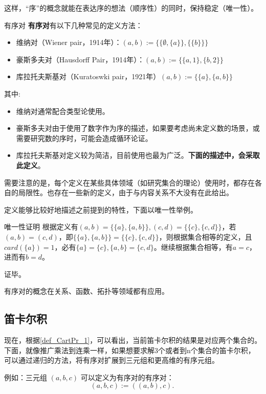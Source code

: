 这样，“序”的概念就能在表达序的想法（顺序性）的同时，保持稳定（唯一性）。

\begin{definition}{有序对}
\textbf{有序对}有以下几种常见的定义方法：
\begin{itemize}
\item 维纳对（Wiener pair，1914年）：$(a, b):= \{\{\emptyset,\{ a\}\}, \{\{b\}\}\} $
\item 豪斯多夫对（Hausdorff Pair，1914年）：$ (a, b):= \{\{a, 1\}, \{b, 2\}\} $
\item 库拉托夫斯基对（Kuratoswki pair，1921年）$(a, b) := \{\{a\}, \{a, b\}\}$
\end{itemize}
\end{definition}
其中:
\begin{itemize}
\item 维纳对通常配合类型论使用。
\item 豪斯多夫对由于使用了数字作为序的描述，如果要考虑尚未定义数的场景，或需要研究数的序时，可能会造成循环论证。
\item 库拉托夫斯基对定义较为简洁，目前使用也最为广泛。\textbf{下面的描述中，会采取此定义}。
\end{itemize}

需要注意的是，每个定义在某些具体领域（如研究集合的理论）使用时，都存在各自的局限性。也存在一些新的定义，由于与内容关系不大没有在此给出。

定义能够比较好地描述之前提到的特性，下面以唯一性举例。
\begin{example}{唯一性证明}
根据定义有$(a, b) = \{\{a\}, \{a, b\}\} , (c, d) = \{\{c\}, \{c, d\}\} $，若$(a, b)=(c,d)$，即$\{\{a\}, \{a, b\}\}=\{\{c\}, \{c, d\}\}$，则根据集合相等的定义，且$card(\{a\})=1$，必有$\{a\}=\{c\},\{a, b\}=\{c, d\}$。继续根据集合相等，有$a=c$，进而有$b=d$。

证毕。
\end{example}

有序对的概念在关系、函数、拓扑等领域都有应用。

\subsection{笛卡尔积}

现在，根据\autoref{def_CartPr_1}，可以看出，当前笛卡尔积的结果是对应两个集合的。下面，就像推广乘法到连乘一样，如果想要求解3个或者到n个集合的笛卡尔积，可以通过递归的方法，将有序对扩展到三元组和更高维的有序元组。

例如：三元组 \((a, b, c)\) 可以定义为有序对的有序对：
$$(a, b, c) := ((a, b), c).~$$

